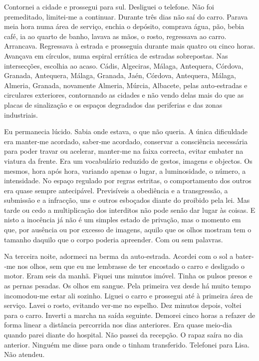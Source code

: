 Contornei a cidade e prossegui para sul. Desliguei o telefone. Não foi
premeditado, limitei­‑me a continuar. Durante três dias não saí do
carro. Parava meia hora numa área de serviço, enchia o depósito,
comprava água, pão, bebia café, ia ao quarto de banho, lavava as mãos, o
rosto, regressava ao carro. Arrancava. Regressava à estrada e prosseguia
durante mais quatro ou cinco horas. Avançava em círculos, numa espiral
errática de estradas sobrepostas. Nas intersecções, escolhia ao acaso.
Cádis, Algeciras, Málaga, Antequera, Córdova, Granada, Antequera,
Málaga, Granada, Jaén, Córdova, Antequera, Málaga, Almeria, Granada,
novamente Almeria, Múrcia, Albacete, pelas auto­‑estradas e circulares
exteriores, contornando as cidades e não vendo delas mais do que as
placas de sinalização e os espaços degradados das periferias e das zonas
industriais.

Eu permanecia lúcido. Sabia onde estava, o que não queria. A única
dificuldade era manter­‑me acordado, saber­‑me acordado, conservar a
consciência necessária para poder travar ou acelerar, manter­‑me na
faixa correcta, evitar embater na viatura da frente. Era um vocabulário
reduzido de gestos, imagens e objectos. Os mesmos, hora após hora,
variando apenas o lugar, a luminosidade, o número, a intensidade. No
espaço regulado por regras estritas, o comportamento dos outros era
quase sempre antecipável. Previsíveis a obediência e a transgressão, a
submissão e a infracção, uns e outros esboçados diante do proibido pela
lei. Mas tarde ou cedo a multiplicação dos interditos não pode senão dar
lugar às coisas. E nisto a inocência já não é um simples estado de
privação, mas o momento em que, por ausência ou por excesso de imagens,
aquilo que os olhos mostram tem o tamanho daquilo que o corpo poderia
apreender. Com ou sem palavras.

Na terceira noite, adormeci na berma da auto­‑estrada. Acordei com o sol
a bater­‑me nos olhos, sem que eu me lembrasse de ter encostado o carro
e desligado o motor. Eram seis da manhã. Fiquei uns minutos imóvel.
Tinha os pulsos presos e as pernas pesadas. Os olhos em sangue. Pela
primeira vez desde há muito tempo incomodou­‑me estar ali sozinho.
Liguei o carro e prossegui até à primeira área de serviço. Lavei o
rosto, evitando ver­‑me no espelho. Dez minutos depois, voltei para o
carro. Inverti a marcha na saída seguinte. Demorei cinco horas a refazer
de forma linear a distância percorrida nos dias anteriores. Era quase
meio­‑dia quando parei diante do hospital. Não passei da recepção. O
rapaz saíra no dia anterior. Ninguém me disse para onde o tinham
transferido. Telefonei para Lisa. Não atendeu.

